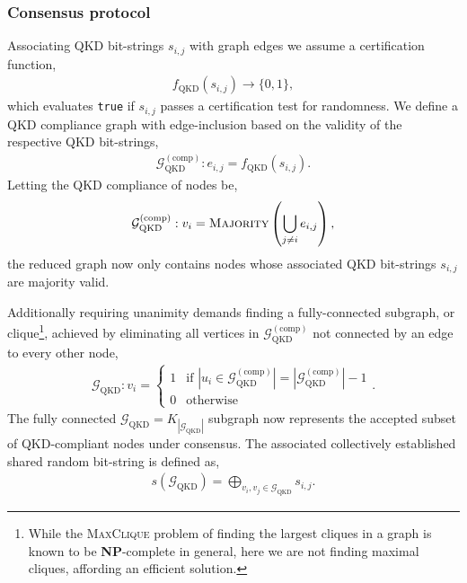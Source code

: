 \subsubsection{Consensus protocol} \label{sec:QRNG_consensus_protocol}

Associating QKD bit-strings $s_{i,j}$ with graph edges we assume a certification function,
\begin{align} \label{eq:QKD_verif}
	f_\mathrm{QKD}(s_{i,j})\to \{0,1\},
\end{align}
which evaluates \texttt{true} if $s_{i,j}$ passes a certification test for randomness. We define a QKD compliance graph with edge-inclusion based on the validity of the respective QKD bit-strings,
\begin{align}
	\mathcal{G}_\mathrm{QKD}^{(\mathrm{comp})}: e_{i,j} = f_\mathrm{QKD}(s_{i,j}).
\end{align}
Letting the QKD compliance of nodes be,
\begin{align} \label{eq:QKD_node_comp}
	\mathcal{G}_\mathrm{QKD}^{(\mathrm{comp})}: v_i = \textsc{Majority}\left(\bigcup_{j\neq i} e_{i,j}\right),
\end{align}
the reduced graph now only contains nodes whose associated QKD bit-strings $s_{i,j}$ are majority valid.

Additionally requiring unanimity demands finding a fully-connected subgraph, or clique\footnote{While the \textsc{MaxClique} problem of finding the largest cliques in a graph is known to be \textbf{NP}-complete in general, here we are not finding maximal cliques, affording an efficient solution.}, achieved by eliminating all vertices in $\mathcal{G}_\mathrm{QKD}^{\mathrm{(comp)}}$ not connected by an edge to every other node,
\begin{align}
	\mathcal{G}_\mathrm{QKD}: v_i =
	\begin{cases}
		1 & \text{if } |u_i \in \mathcal{G}_\mathrm{QKD}^{\mathrm{(comp)}}| = |\mathcal{G}_\mathrm{QKD}^{\mathrm{(comp)}}| - 1 \\
		0 & \text{otherwise}
	\end{cases}.
\end{align}
The fully connected \mbox{$\mathcal{G}_\mathrm{QKD}= K_{|\mathcal{G}_\mathrm{QKD}|}$} subgraph now represents the accepted subset of QKD-compliant nodes under consensus. The associated collectively established shared random bit-string is defined as,
\begin{align}
	s(\mathcal{G}_\mathrm{QKD}) = \bigoplus_{v_i,v_j\in \mathcal{G}_\mathrm{QKD}} {s_{i,j}}.
\end{align}

